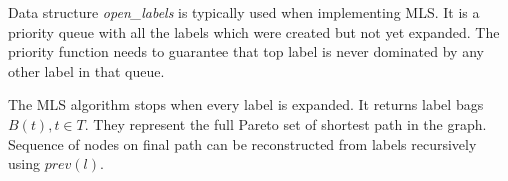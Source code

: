 Data structure {\em open\_labels} is typically used when implementing MLS. It is a priority queue with all the labels which were created but not yet expanded. The priority function needs to guarantee that top label is never dominated by any other label in that queue.

The MLS algorithm stops when every label is expanded. It returns label bags $B(t), t \in T$. 
They represent the full Pareto set of shortest path in the graph.
Sequence of nodes on final path can be reconstructed from labels recursively using $prev(l)$.


